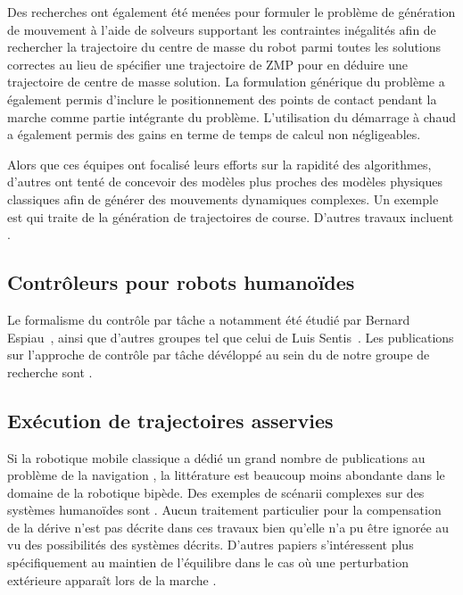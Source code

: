 Des recherches ont également été menées pour formuler le problème de
génération de mouvement à l'aide de solveurs supportant les
contraintes inégalités
\cite{11dimitrov.icra,10herdt.ar} afin de rechercher la trajectoire du
centre de masse du robot parmi toutes les solutions correctes au lieu
de spécifier une trajectoire de ZMP pour en déduire une trajectoire de
centre de masse solution. La formulation générique du problème a
également permis d'inclure le positionnement des points de contact
pendant la marche comme partie intégrante du problème. L'utilisation
du démarrage à chaud \cite{09dimitrov.icra} a
également permis des gains en terme de temps de calcul non
négligeables.


Alors que ces équipes ont focalisé leurs efforts sur la rapidité des
algorithmes, d'autres ont tenté de concevoir des modèles plus proches
des modèles physiques classiques afin de générer des mouvements
dynamiques complexes. Un exemple est \cite{09mombaur.robotica} qui
traite de la génération de trajectoires de course. D'autres travaux
incluent \cite{07suleiman.humanoids,08kanehiro.rsj}.


\subsection{Contrôleurs pour robots humanoïdes}


Le formalisme du contrôle par tâche a notamment été étudié par Bernard
Espiau \cite{89iser.rives}, ainsi que d'autres groupes tel que celui
de Luis Sentis \cite{05sentis.icra}. Les publications sur l'approche
de contrôle par tâche dévéloppé au sein du de notre groupe de
recherche sont
\cite{09mansard.icar,05yoshida.humanoids,10kanoun.humanoids}.


\subsection{Exécution de trajectoires asservies}

Si la robotique mobile classique a dédié un grand nombre de
publications au problème de la navigation
\cite{91samson.icra,05lefebvre.icra}, la littérature est beaucoup
moins abondante dans le domaine de la robotique bipède. Des exemples
de scénarii complexes sur des systèmes humanoïdes sont
\cite{05michel.humanoids,10chestnutt,09chestnutt.rsj}. Aucun
traitement particulier pour la compensation de la dérive n'est pas
décrite dans ces travaux bien qu'elle n'a pu être ignorée au vu des
possibilités des systèmes décrits. D'autres papiers s'intéressent plus
spécifiquement au maintien de l'équilibre dans le cas où une
perturbation extérieure apparaît lors de la marche
\cite{07morisawa.icra}.


